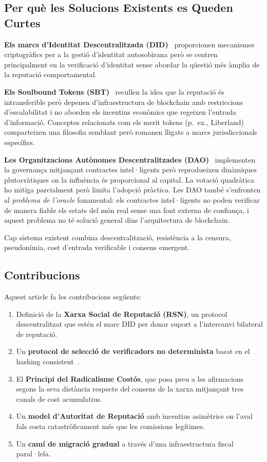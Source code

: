 \documentclass[11pt,a4paper,twocolumn]{article}
\begin{document}
\subsection{Per què les Solucions Existents es Queden Curtes}

\textbf{Els marcs d'Identitat Descentralitzada (DID)}~\cite{did2022} proporcionen mecanismes criptogràfics per a la gestió d'identitat autosobirana però se centren principalment en la verificació d'identitat sense abordar la qüestió més àmplia de la reputació comportamental.

\textbf{Els Soulbound Tokens (SBT)}~\cite{weyl2022} recullen la idea que la reputació és intransferible però depenen d'infraestructura de blockchain amb restriccions d'escalabilitat i no aborden els incentius econòmics que regeixen l'entrada d'informació. Conceptes relacionats com els merit tokens (p.\ ex., Liberland) comparteixen una filosofia semblant però romanen lligats a marcs jurisdiccionals específics.

\textbf{Les Organitzacions Autònomes Descentralitzades (DAO)}~\cite{buterin2014} implementen la governança mitjançant contractes intel·ligents però reprodueixen dinàmiques plutocràtiques on la influència és proporcional al capital. La votació quadràtica~\cite{buterin2019} ho mitiga parcialment però limita l'adopció pràctica. Les DAO també s'enfronten al \emph{problema de l'oracle} fonamental: els contractes intel·ligents no poden verificar de manera fiable els estats del món real sense una font externa de confiança, i aquest problema no té solució general dins l'arquitectura de blockchain.

Cap sistema existent combina descentralització, resistència a la censura, pseudonímia, cost d'entrada verificable i consens emergent.

\subsection{Contribucions}

Aquest article fa les contribucions següents:
\begin{enumerate}[nosep]
\item Definició de la \textbf{Xarxa Social de Reputació (RSN)}, un protocol descentralitzat que estén el marc DID per donar suport a l'intercanvi bilateral de reputació.
\item Un \textbf{protocol de selecció de verificadors no determinista} basat en el hashing consistent~\cite{karger1997}.
\item El \textbf{Principi del Radicalisme Costós}, que posa preu a les afirmacions segons la seva distància respecte del consens de la xarxa mitjançant tres canals de cost acumulatius.
\item Un \textbf{model d'Autoritat de Reputació} amb incentius asimètrics on l'aval fals costa catastròficament més que les comissions legítimes.
\item Un \textbf{camí de migració gradual} a través d'una infraestructura fiscal paral·lela.
\end{enumerate}
\end{document}
